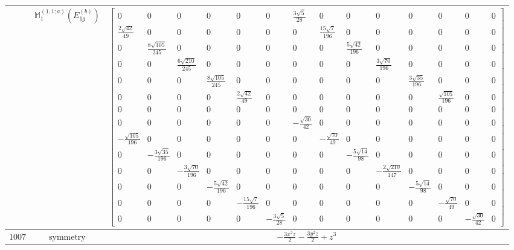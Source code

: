 \documentclass[fleqn,8pt,landscape]{jsarticle}
\begin{document}
\begin{longtable}{ccc}
$  $ & $ \mathbb{M}_{1}^{(1,1;a)}(E_{1g}^{(b)}) $ & $ \begin{bmatrix} 0 & 0 & 0 & 0 & 0 & 0 & \frac{3 \sqrt{5}}{28} & 0 & 0 & 0 & 0 & 0 & 0 & 0 \\ \frac{2 \sqrt{42}}{49} & 0 & 0 & 0 & 0 & 0 & 0 & \frac{15 \sqrt{7}}{196} & 0 & 0 & 0 & 0 & 0 & 0 \\ 0 & \frac{8 \sqrt{105}}{245} & 0 & 0 & 0 & 0 & 0 & 0 & \frac{5 \sqrt{42}}{196} & 0 & 0 & 0 & 0 & 0 \\ 0 & 0 & \frac{6 \sqrt{210}}{245} & 0 & 0 & 0 & 0 & 0 & 0 & \frac{3 \sqrt{70}}{196} & 0 & 0 & 0 & 0 \\ 0 & 0 & 0 & \frac{8 \sqrt{105}}{245} & 0 & 0 & 0 & 0 & 0 & 0 & \frac{3 \sqrt{35}}{196} & 0 & 0 & 0 \\ 0 & 0 & 0 & 0 & \frac{2 \sqrt{42}}{49} & 0 & 0 & 0 & 0 & 0 & 0 & \frac{\sqrt{105}}{196} & 0 & 0 \\ 0 & 0 & 0 & 0 & 0 & 0 & 0 & 0 & 0 & 0 & 0 & 0 & 0 & 0 \\ 0 & 0 & 0 & 0 & 0 & 0 & - \frac{\sqrt{30}}{42} & 0 & 0 & 0 & 0 & 0 & 0 & 0 \\ - \frac{\sqrt{105}}{196} & 0 & 0 & 0 & 0 & 0 & 0 & - \frac{\sqrt{70}}{49} & 0 & 0 & 0 & 0 & 0 & 0 \\ 0 & - \frac{3 \sqrt{35}}{196} & 0 & 0 & 0 & 0 & 0 & 0 & - \frac{5 \sqrt{14}}{98} & 0 & 0 & 0 & 0 & 0 \\ 0 & 0 & - \frac{3 \sqrt{70}}{196} & 0 & 0 & 0 & 0 & 0 & 0 & - \frac{2 \sqrt{210}}{147} & 0 & 0 & 0 & 0 \\ 0 & 0 & 0 & - \frac{5 \sqrt{42}}{196} & 0 & 0 & 0 & 0 & 0 & 0 & - \frac{5 \sqrt{14}}{98} & 0 & 0 & 0 \\ 0 & 0 & 0 & 0 & - \frac{15 \sqrt{7}}{196} & 0 & 0 & 0 & 0 & 0 & 0 & - \frac{\sqrt{70}}{49} & 0 & 0 \\ 0 & 0 & 0 & 0 & 0 & - \frac{3 \sqrt{5}}{28} & 0 & 0 & 0 & 0 & 0 & 0 & - \frac{\sqrt{30}}{42} & 0 \end{bmatrix} $ \\ \hline
$ 1007 $ & $ \text{symmetry} $ & $ - \frac{3 x^{2} z}{2} - \frac{3 y^{2} z}{2} + z^{3} $ \\

\end{longtable}
\end{document}
